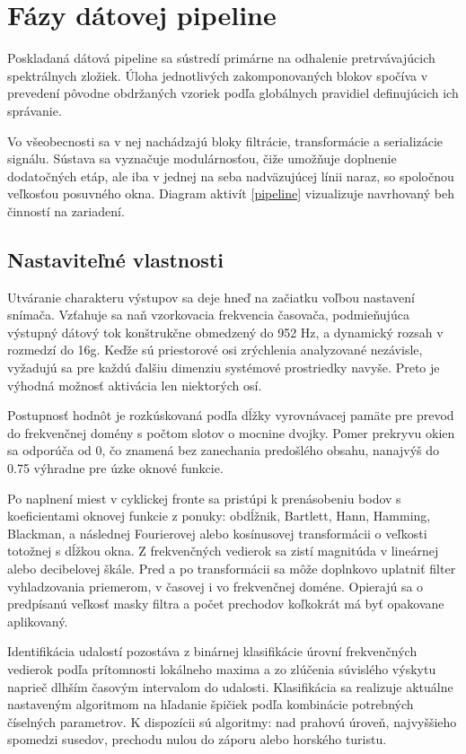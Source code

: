 \section{Fázy dátovej pipeline}
Poskladaná dátová pipeline sa sústredí primárne na odhalenie pretrvávajúcich spektrálnych zložiek. Úloha jednotlivých
zakomponovaných blokov spočíva v prevedení pôvodne obdržaných vzoriek podľa globálnych pravidiel definujúcich ich správanie.

Vo všeobecnosti sa v nej nachádzajú bloky filtrácie, transformácie a serializácie signálu. Sústava sa
vyznačuje modulárnosťou, čiže umožňuje doplnenie dodatočných etáp, ale iba v jednej na seba nadväzujúcej
línii naraz, so spoločnou veľkosťou posuvného okna. Diagram aktivít \ref{pipeline}
vizualizuje navrhovaný beh činností na zariadení.

\subsection{Nastaviteľné vlastnosti}
Utváranie charakteru výstupov sa deje hneď na začiatku voľbou nastavení snímača.
Vzťahuje sa naň vzorkovacia frekvencia časovača, podmieňujúca výstupný dátový tok konštrukčne obmedzený do 952 Hz,
a dynamický rozsah v rozmedzí do 16g. Keďže sú priestorové osi zrýchlenia analyzované nezávisle, vyžadujú sa pre každú ďalšiu
dimenziu systémové prostriedky navyše. Preto je výhodná možnosť aktivácia len niektorých osí.

Postupnosť hodnôt je rozkúskovaná podľa dĺžky vyrovnávacej pamäte pre prevod do frekvenčnej domény s počtom slotov
o mocnine dvojky. Pomer prekryvu okien sa odporúča od 0, čo znamená bez zanechania predošlého obsahu, nanajvýš
do 0.75 výhradne pre úzke oknové funkcie.

Po naplnení miest v cyklickej fronte sa pristúpi k prenásobeniu bodov s koeficientami oknovej funkcie
z ponuky: obdĺžnik, Bartlett, Hann, Hamming, Blackman, a následnej Fourierovej alebo kosínusovej transformácii
o veľkosti totožnej s dĺžkou okna. Z frekvenčných vedierok sa zistí magnitúda v lineárnej alebo decibelovej škále.
Pred a po transformácii sa môže doplnkovo uplatniť filter vyhladzovania priemerom, v časovej i vo frekvenčnej doméne.
Opierajú sa o predpísanú veľkosť masky filtra a počet prechodov koľkokrát má byť opakovane aplikovaný.

Identifikácia udalostí pozostáva z binárnej klasifikácie úrovní frekvenčných vedierok podľa prítomnosti lokálneho maxima a
zo zlúčenia súvislého výskytu naprieč dlhším časovým intervalom do udalosti. Klasifikácia sa realizuje
aktuálne nastaveným algoritmom na hľadanie špičiek podľa kombinácie potrebných číselných parametrov. K dispozícii sú
algoritmy: nad prahovú úroveň, najvyššieho spomedzi susedov, prechodu nulou do záporu alebo horského turistu.

